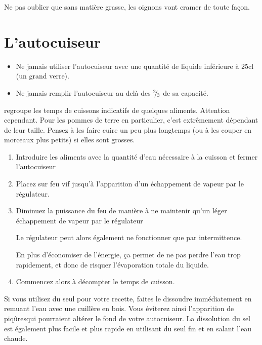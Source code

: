 \documentclass[a4paper,twoside]{report}
\begin{document}
\begin{remarque}
Ne pas oublier que sans matière grasse, les oignons vont cramer de toute façon.
\end{remarque}


\section{L'autocuiseur}
\begin{attention}
\begin{itemize}
\item Ne jamais utiliser l'autocuiseur avec une quantité de liquide inférieure à 25cl (un grand verre).
\item Ne jamais remplir l'autocuiseur au delà des ${{}^{2\!\!}/ _{\!3}}$ de sa capacité.
\end{itemize}
\end{attention}

 regroupe les temps de cuissons indicatifs de quelques aliments. Attention cependant. Pour les pommes de terre en particulier, c'est extrêmement dépendant de leur taille. Pensez à les faire cuire un peu plus longtemps (ou à les couper en morceaux plus petits) si elles sont grosses.

\begin{enumerate}
\item Introduire les aliments avec la quantité d'eau nécessaire à la cuisson et fermer l'autocuiseur
\item Placez sur feu vif jusqu'à l'apparition d'un échappement de vapeur par le régulateur.
\item Diminuez la puissance du feu de manière à ne maintenir qu'un léger échappement de vapeur par le régulateur 
\begin{remarque}
Le régulateur peut alors également ne fonctionner que par intermittence.

En plus d'économiser de l'énergie, ça permet de ne pas perdre l'eau trop rapidement, et donc de risquer l'évaporation totale du liquide.
\end{remarque}
\item Commencez alors à décompter le temps de cuisson.
\end{enumerate}

\begin{remarque}
Si vous utilisez du seul pour votre recette, faites le dissoudre immédiatement en remuant l'eau avec une cuillère en bois. Vous éviterez ainsi l'apparition de \og piqûres\fg qui pourraient altérer le fond de votre autocuiseur. La dissolution du sel est également plus facile et plus rapide en utilisant du seul fin et en salant l'eau chaude.
\end{remarque}
\end{document}
